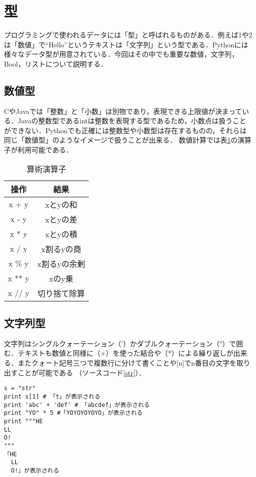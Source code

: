 
\section{型}
プログラミングで使われるデータには「型」と呼ばれるものがある．例えば1や2は「数値」で``Hello''というテキストは「文字列」という型である．Pythonには様々なデータ型が用意されている．今回はその中でも重要な数値，文字列，Bool，リストについて説明する．
\subsection{数値型}
CやJavaでは「整数」と「小数」は別物であり，表現できる上限値が決まっている．Javaの整数型であるintは整数を表現する型であるため，小数点は扱うことができない．Pythonでも正確には整数型や小数型は存在するものの，それらは同じ「数値型」のようなイメージで扱うことが出来る．
数値計算では表\ref{arithmetic_operator}の演算子が利用可能である．

\begin{table}[h]
\centering
 \caption{算術演算子}
  \begin{tabular}{|c|c|} \hline
    操作 & 結果  \\ \hline \hline
    x + y & xとyの和 \\ \hline
    x - y & xとyの差 \\ \hline
    x * y & xとyの積 \\ \hline
    x / y & x割るyの商 \\ \hline
    x \% y & x割るyの余剰 \\ \hline
    x ** y & xのy乗 \\ \hline
    x // y & 切り捨て除算 \\ \hline
  \end{tabular} 
 \label{arithmetic_operator}
\end{table}

\subsection{文字列型}
文字列はシングルクォーテーション（'）かダブルクォーテーション（"）で囲む．テキストも数値と同様に（+）を使った結合や（*）による繰り返しが出来る．またクォート記号三つで複数行に分けて書くことや[n]でn番目の文字を取り出すことが可能である （ソースコード\ref{str}）．
\begin{lstlisting}[caption=文字列の操作, label=str]
s = "str"
print s[1] # 「t」が表示される
print 'abc' + 'def' # 「abcdef」が表示される
print "YO" * 5 #「YOYOYOYOYO」が表示される 
print """HE
LL
O!
"""
「HE
  LL
  O!」が表示される
\end{lstlisting}

